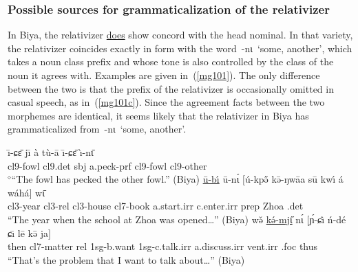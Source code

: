 \documentclass[10pt,twoside]{article}
\makeatletter
\def\ci#1{{\ipaFont #1}}
\newcommand{\gl}[1]{`#1'}
\newcommand{\cl}[1]{{\sc cl#1}}
\def\elicited{$^\diamond$}
\def\til{\raise.17ex\hbox{$\scriptstyle\mathtt{\sim}$}}	%
\def\ML#1{#1\symbol{"1DC6}} %
\renewcommand{\i}{ı}
\def\@{ə}
\def\eh{ɛ}
\def\ih{ɩ}
\def\ng{ŋ}
\def\ny{ɲ}
\def\sh{ɕ}
\makeatother
\begin{document}
\subsubsection{Possible sources for grammaticalization of the relativizer}
%
In Biya, the relativizer \uline{does} show concord with the head nominal. 
In that variety, the relativizer coincides exactly in form with the word~\ci{-n\ih}~\gl{some, another},
which takes a noun class prefix and whose tone is also controlled by the
class of the noun it agrees with.\footnotemark\/ 
Examples are given in~(\ref{mg101}). The only difference between the two
is that the prefix of the relativizer is occasionally omitted in casual
speech, as in~(\ref{mg101c}).%
 Since the agreement
facts between the two morphemes are identical, it seems likely that
the relativizer in Biya has grammaticalized from~\ci{-n\ih}~\gl{some, another}.
%
\begin{exe}
\ex \label{mg101}
\begin{xlist}
\ex
\gll \=\i-\sh\={\eh} j\={\i} \`a t\`u-\=a \={\i}-\sh{\=\eh} \`\i-n\={\ih}	\\
\cl9-fowl \cl9.{\sc det} {\sc sbj} a.peck-{\sc prf} \cl9-fowl \cl9-other	\\
\glt \elicited``The fowl has pecked the other fowl.'' (Biya)
\ex
\gll \uline{\=u-b\'{\i}} \=u-n\'{\ih} $[$\'u-kp\H{\@} k\={\@}-\ng{w\={a}{a}} s\=u kw\'{\i} \'a w\'ah\'a$]$ w\={\ih}	\\
\cl3-year \cl3-{\sc rel} \cl3-house \cl7-book a.start.{\sc irr} c.enter.{\sc irr} {\sc prep} Zhoa {\sc \cl3.det}	\\
\glt ``The year when the school at Zhoa was opened\dots'' (Biya)
\ex \label{mg101c}
\gll w\v{\@} \uline{k\'{\@}-mj\H{\ih}} n\'{\ih} $[$\'\ny-\sh\^{\i} \'n-d\'e \sh\={\i} l\={e} k\={\@} j\ML{a}$]$	\\
then \cl7-matter {\sc rel} 1sg-b.want 1sg-c.talk.{\sc irr} a.discuss.{\sc irr} {\sc vent.irr} {\sc \cl7.foc} thus	\\
\glt ``That's the problem that I want to talk about\dots'' (Biya)
\end{xlist}
\end{exe}
\end{document}

